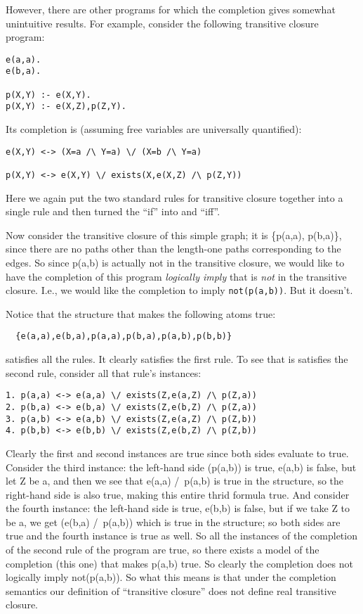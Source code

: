 However, there are other programs for which the completion gives
somewhat unintuitive results.  For example, consider the following
transitive closure program:
\begin{verbatim}
e(a,a).
e(b,a).

p(X,Y) :- e(X,Y).
p(X,Y) :- e(X,Z),p(Z,Y).
\end{verbatim}
Its completion is (assuming free variables are universally
quantified):
\begin{verbatim}
e(X,Y) <-> (X=a /\ Y=a) \/ (X=b /\ Y=a)

p(X,Y) <-> e(X,Y) \/ exists(X,e(X,Z) /\ p(Z,Y))
\end{verbatim}
Here we again put the two standard rules for transitive closure
together into a single rule and then turned the ``if'' into and
``iff''.

Now consider the transitive closure of this simple graph; it is
\{p(a,a), p(b,a)\}, since there are no paths other than the length-one
paths corresponding to the edges.  So since p(a,b) is actually not in
the transitive closure, we would like to have the completion of this
program {\em logically imply} that is {\em not} in the transitive
closure.  I.e., we would like the completion to imply
\verb|not(p(a,b))|.  But it doesn't.

Notice that the structure that makes the following atoms true: 
\begin{verbatim}
  {e(a,a),e(b,a),p(a,a),p(b,a),p(a,b),p(b,b)}
\end{verbatim}
satisfies all the rules.  It clearly satisfies the first rule.  To see
that is satisfies the second rule, consider all that rule's instances:
\begin{verbatim}
1. p(a,a) <-> e(a,a) \/ exists(Z,e(a,Z) /\ p(Z,a))
2. p(b,a) <-> e(b,a) \/ exists(Z,e(b,Z) /\ p(Z,a))
3. p(a,b) <-> e(a,b) \/ exists(Z,e(a,Z) /\ p(Z,b))
4. p(b,b) <-> e(b,b) \/ exists(Z,e(b,Z) /\ p(Z,b))
\end{verbatim}
Clearly the first and second instances are true since both sides
evaluate to true.  Consider the third instance: the left-hand side
(p(a,b)) is true, e(a,b) is false, but let Z be a, and then we see
that e(a,a) /\ p(a,b) is true in the structure, so the right-hand side
is also true, making this entire thrid formula true.  And consider the
fourth instance: the left-hand side is true, e(b,b) is false, but if
we take Z to be a, we get (e(b,a) /\ p(a,b)) which is true in the
structure; so both sides are true and the fourth instance is true as
well.  So all the instances of the completion of the second rule of
the program are true, so there exists a model of the completion (this
one) that makes p(a,b) true.  So clearly the completion does not
logically imply not(p(a,b)).  So what this means is that under the
completion semantics our definition of ``transitive closure'' does not
define real transitive closure.

